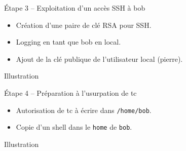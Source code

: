 \documentclass{beamer}
\begin{document}
        \begin{frame}[fragile]
            \begin{block}{Étape 3 -- Exploitation d'un accès SSH à bob}
                \begin{itemize}
                    \item Création d'une paire de clé RSA pour SSH.
                    \item Logging en tant que bob en local.
                    \item Ajout de la clé publique de l'utilisateur local (pierre).
                \end{itemize}
            \end{block}
            \begin{exampleblock}{Illustration}
                \begin{center}
                \end{center}
            \end{exampleblock}
        \end{frame}

        \begin{frame}[fragile]
            \begin{block}{Étape 4 -- Préparation à l'usurpation de tc}
                \begin{itemize}
                    \item Autorisation de tc à écrire dans \verb+/home/bob+.
                    \item Copie d'un shell dans le \verb+home+ de \verb+bob+.
                \end{itemize}
            \end{block}
            \begin{exampleblock}{Illustration}
                \begin{center}
                \end{center}
            \end{exampleblock}
        \end{frame}
        
\end{document}
